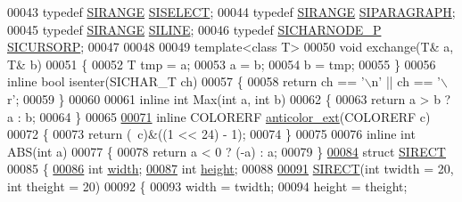 \begin{DoxyCode}
00043 \textcolor{keyword}{typedef} \hyperlink{struct_s_i_r_a_n_g_e}{SIRANGE} \hyperlink{struct_s_i_r_a_n_g_e}{SISELECT};
00044 \textcolor{keyword}{typedef} \hyperlink{struct_s_i_r_a_n_g_e}{SIRANGE} \hyperlink{struct_s_i_r_a_n_g_e}{SIPARAGRAPH};
00045 \textcolor{keyword}{typedef} \hyperlink{struct_s_i_r_a_n_g_e}{SIRANGE} \hyperlink{struct_s_i_r_a_n_g_e}{SILINE};
00046 \textcolor{keyword}{typedef} \hyperlink{class_s_i_c_h_a_r_n_o_d_e}{SICHARNODE\_P} \hyperlink{class_s_i_c_h_a_r_n_o_d_e}{SICURSORP};
00047 
00048 
00049 \textcolor{keyword}{template}<\textcolor{keyword}{class} T>
00050 \textcolor{keywordtype}{void} exchange(T& a, T& b)
00051 \{
00052     T tmp = a;
00053     a = b;
00054     b = tmp;
00055 \}
00056 \textcolor{keyword}{inline} \textcolor{keywordtype}{bool} isenter(SICHAR\_T ch)
00057 \{
00058     \textcolor{keywordflow}{return} ch == \textcolor{charliteral}{'\(\backslash\)n'} || ch == \textcolor{charliteral}{'\(\backslash\)r'};
00059 \}
00060 
00061 \textcolor{keyword}{inline} \textcolor{keywordtype}{int} Max(\textcolor{keywordtype}{int} a, \textcolor{keywordtype}{int} b)
00062 \{
00063     \textcolor{keywordflow}{return} a > b ? a : b;
00064 \}
00065 
\hyperlink{kernal_8h_abd07a7735390aea7bf376c2bcc75bd96}{00071} \textcolor{keyword}{inline} COLORERF \hyperlink{kernal_8h_abd07a7735390aea7bf376c2bcc75bd96}{anticolor\_ext}(COLORERF c)
00072 \{
00073     \textcolor{keywordflow}{return} (~c)&((1 << 24) - 1);
00074 \}
00075 
00076 \textcolor{keyword}{inline} \textcolor{keywordtype}{int} ABS(\textcolor{keywordtype}{int} a)
00077 \{
00078     \textcolor{keywordflow}{return} a < 0 ? (-a) : a;
00079 \}
\hyperlink{struct_s_i_r_e_c_t}{00084} \textcolor{keyword}{struct }\hyperlink{struct_s_i_r_e_c_t}{SIRECT}
00085 \{
\hyperlink{struct_s_i_r_e_c_t_a99dbd77d045cc587f0c1f40bbba99ac8}{00086}     \textcolor{keywordtype}{int} \hyperlink{struct_s_i_r_e_c_t_a99dbd77d045cc587f0c1f40bbba99ac8}{width}; 
\hyperlink{struct_s_i_r_e_c_t_a6577f3092897d4bef17aab5ec4d62819}{00087}     \textcolor{keywordtype}{int} \hyperlink{struct_s_i_r_e_c_t_a6577f3092897d4bef17aab5ec4d62819}{height};   
00088 
\hyperlink{struct_s_i_r_e_c_t_a845bf8054bfcbdf5336798f61d220d05}{00091}     \hyperlink{struct_s_i_r_e_c_t_a845bf8054bfcbdf5336798f61d220d05}{SIRECT}(\textcolor{keywordtype}{int} twidth = 20, \textcolor{keywordtype}{int} theight = 20) 
00092     \{
00093         width = twidth;
00094         height = theight;

\end{DoxyCode}
